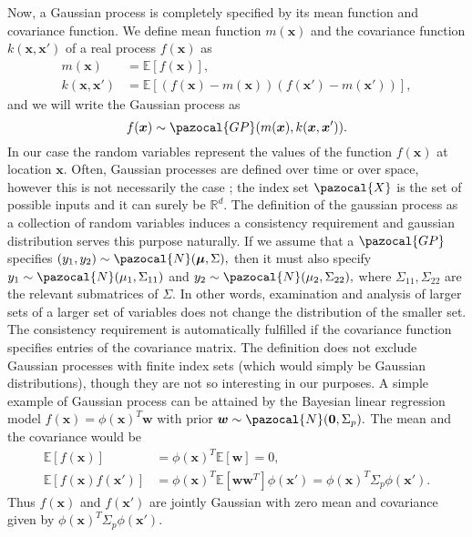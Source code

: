 \documentclass[12pt,a4paper,oneside]{book}
\theoremstyle{plain}
\theoremstyle{definition}
\begin{document}
{\vspace{3mm}
\noindent
Now, a Gaussian process is completely specified by its mean function and covariance function. We define mean function $m(\bm{x})$ and the covariance function $k(\bm{x},\bm{x}')$ of a real process $f(\bm{x})$ as
\begin{align*}
m(\bm{x})&= \mathbb{E} [f(\bm{x})],\\
k(\bm{x},\bm{x}')&=\mathbb{E}[(f(\bm{x})-m(\bm{x}))(f(\bm{x}')-m(\bm{x}'))],
\end{align*}
and we will write the Gaussian process as
$$f(\bm{x})\sim \pazocal{GP}(m(\bm{x}),k(\bm{x},\bm{x}')).$$
In our case the random variables represent the values of the function $f(\bm{x})$ at location $\bm{x}.$ Often, Gaussian processes are defined over time or over space, however this is not necessarily the case ; the index set $\pazocal{X}$ is the set of possible inputs and it can surely be $\mathbb{R}^d.$
\vspace{3mm}\newline
The definition of the gaussian process as a collection of random variables induces a consistency requirement and gaussian distribution serves this purpose naturally. If we assume that a $\pazocal{GP}$ specifies $(y_1,y_2) \sim \pazocal{N}(\bm{\mu},\Sigma),$ then it must also specify $y_1 \sim \pazocal{N}(\mu_1,\Sigma_{11})$ and $y_2 \sim \pazocal{N}(\mu_2,\Sigma_{22}),$ where $\Sigma_{11},\Sigma_{22}$ are the relevant submatrices of $\Sigma.$ In other words, examination and analysis of larger sets of a larger set of variables does not change the distribution of the smaller set. The consistency requirement is automatically fulfilled if the covariance function specifies entries of the covariance matrix. The definition does not exclude Gaussian processes with finite index sets (which would simply be Gaussian distributions), though they are not so interesting in our purposes.
\vspace{3mm}\newline
A simple example of Gaussian process can be attained by the Bayesian linear regression model $f(\bm{x})=\phi(\bm{x})^T\bm{w}$ with prior $\bm{w}\sim \pazocal{N}(\bm{0},\Sigma_p).$ The mean and the covariance would be 
\begin{align*}
\mathbb{E}[f(\bm{x})]&= \phi(\bm{x})^T \mathbb{E}[\bm{w}]=0,\\
\mathbb{E}[f(\bm{x})f(\bm{x}')]&=\phi(\bm{x})^T \mathbb{E}[\bm{w}\bm{w}^T]\phi(\bm{x}')=\phi(\bm{x})^T\Sigma_p \phi(\bm{x}').
\end{align*} 
Thus $f(\bm{x})$ and $f(\bm{x}')$ are jointly Gaussian with zero mean and covariance given by $\phi(\bm{x})^T\Sigma_p \phi(\bm{x}')$.
}
\end{document}
